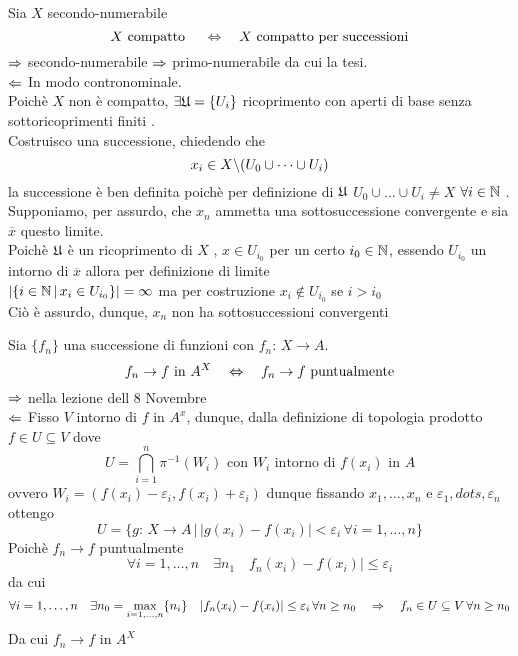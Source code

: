 \spazio
\begin{thm}Sia $X$ secondo-numerabile
$$ X \text{ compatto } \quad \Leftrightarrow \quad X \text{ compatto per successioni}$$
\proof $\Rightarrow$ secondo-numerabile $\Rightarrow$ primo-numerabile da cui la tesi.\\
$\Leftarrow$ In modo contronominale.\\
Poich\`e $X$ non \`e compatto, $\exists \mathfrak{U} =\{ U_i\}$ ricoprimento con aperti di base senza sottoricoprimenti finiti .\\
Costruisco una successione, chiedendo che 
$$ x_i \in X \backslash ( U_0 \cup \dots \cup U_{i})$$
la successione \`e ben definita poich\`e per definizione  di $\mathfrak{U}$ $U_0 \cup \dots \cup U_i \neq X $ $\forall i \in \mathbb{N}$ .\\
Supponiamo, per assurdo, che $x_n$ ammetta una sottosuccessione convergente e sia $\overline{x}$ questo limite.\\
Poich\`e $\mathfrak{U}$ \`e un ricoprimento di $X$ , $ x \in U_{i_0}$ per un certo $i_0 \in \mathbb{N}$, essendo $U_{i_0}$ un intorno di $\overline{x}$ allora per definizione di limite\\
$ \vert \{ i \in \mathbb{N} \, \vert \, x_i \in U_{i_0} \}\vert  = \infty$ ma per costruzione $x_i \not \in U_{i_0}$  se $i>i_0$\\
Ci\`o \`e assurdo, dunque, $x_n$ non ha sottosuccessioni convergenti \endproof
\end{thm}
\begin{lem}Sia $\{f_n\}$ una successione di funzioni con $f_n:\, X \to A $.
$$f_n \to f \text{ in } A^X \quad \Leftrightarrow \quad f_n \to f \text{ puntualmente} $$
\proof $\Rightarrow$ nella lezione dell 8 Novembre\\
$\Leftarrow$ Fisso $V$ intorno di $f$ in $A^x$, dunque, dalla definizione di topologia prodotto $f\in U \subseteq V $ dove 
$$ U = \bigcap_{i=1}^n \pi^{-1}(W_i) \text{ con } W_i \text{ intorno di } f(x_i) \text{ in } A $$
ovvero $W_i= ( f(x_i) -\varepsilon_i , f(x_i)+\varepsilon_i)$ dunque fissando $x_1, \dots, x_n$ e $\varepsilon_1, dots, \varepsilon_n$ ottengo
$$ U =\{ g:\, X \to A \, \vert \, \vert g(x_i)-f(x_i) \vert < \varepsilon_i \, \forall i=1,\dots, n \}$$
Poich\`e $f_n \to f $ puntualmente 
$$ \forall i=1, \dots, n \quad \exists n_1 \quad f_n(x_i)-f(x_i)\vert \leq \varepsilon_i$$
da cui
$$ \forall i=1, 
\dots, n \quad \exists n_0 =\max_{i=1,\dots, n } \{ n_i \} \quad \vert f_n (x_i) - f(x_i)\vert \leq \varepsilon_i \, \forall n \geq n_0 \quad  \Rightarrow \quad f_n \in U \subseteq V \, \forall n \geq n_0$$
Da cui $f_n \to f$ in $A^X$
\endproof
\end{lem}
